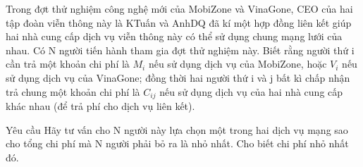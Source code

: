 Trong đợt thử nghiệm công nghệ mới của MobiZone và VinaGone, CEO của hai tập đoàn viễn thông này là KTuấn và AnhDQ đã kí một hợp đồng liên kết giúp hai nhà cung cấp dịch vụ viễn thông này có thể sử dụng chung mạng lưới của nhau. Có N người tiến hành tham gia đợt thử nghiệm này. Biết rằng người thứ i cần trả một khoản chi phí là $M_{i}$   nếu sử dụng dịch vụ của MobiZone, hoặc $V_{i}$   nếu sử dụng dịch vụ của VinaGone; đồng thời hai người thứ i và j bất kì chấp nhận trả chung một khoản chi phí là $C_{ij}$   nếu sử dụng dịch vụ của hai nhà cung cấp khác nhau (để trả phí cho dịch vụ liên kết).  

Yêu cầu
Hãy tư vấn cho N người này lựa chọn một trong hai dịch vụ mạng sao cho tổng chi phí mà N người phải bỏ ra là nhỏ nhất. Cho biết chi phí nhỏ nhất đó.